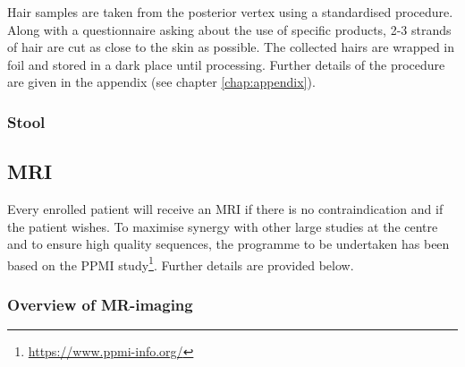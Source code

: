 Hair samples are taken from the posterior vertex using a standardised procedure. Along with a questionnaire asking about the use of specific products, 2-3 strands of hair are cut as close to the skin as possible. The collected hairs are wrapped in foil and stored in a dark place until processing. Further details of the procedure are given in the appendix (see chapter \ref{chap:appendix}).

\subsubsection{Stool}
\label{biosamples:stool}


\subsection{\ac{MRI}}
\label{subsec:MRI}
Every enrolled patient will receive an \ac{MRI} if there is no contraindication and if the patient wishes. To maximise synergy with other large studies at the centre and to ensure high quality sequences, the programme to be undertaken has been based on the PPMI study\footnote{\url{https://www.ppmi-info.org/}}. Further details are provided below.
\subsubsection{Overview of MR-imaging}

